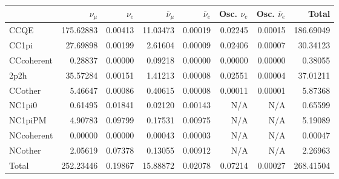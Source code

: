 \begin{tabular} { | l ||r | r | r | r | r | r | | r | }
\hline
              & $\nu_\mu$            & $\nu_e$              & $\bar{\nu}_{\mu}$    & $\bar{\nu}_{e}$      & Osc. $\nu_e$         & Osc. $\bar{\nu}_{e}$ & Total                \\ \hline\hline
 CCQE         & 175.62883            & 0.00413              & 11.03473             & 0.00019              & 0.02245              & 0.00015              & 186.69049            \\ \hline
 CC1pi        & 27.69898             & 0.00199              & 2.61604              & 0.00009              & 0.02406              & 0.00007              & 30.34123             \\ \hline
 CCcoherent   & 0.28837              & 0.00000              & 0.09218              & 0.00000              & 0.00000              & 0.00000              & 0.38055              \\ \hline
 2p2h         & 35.57284             & 0.00151              & 1.41213              & 0.00008              & 0.02551              & 0.00004              & 37.01211             \\ \hline
 CCother      & 5.46647              & 0.00086              & 0.40615              & 0.00008              & 0.00011              & 0.00001              & 5.87368              \\ \hline
 NC1pi0       & 0.61495              & 0.01841              & 0.02120              & 0.00143              & N/A                  & N/A                  & 0.65599              \\ \hline
 NC1piPM      & 4.90783              & 0.09799              & 0.17531              & 0.00975              & N/A                  & N/A                  & 5.19089              \\ \hline
 NCcoherent   & 0.00000              & 0.00000              & 0.00043              & 0.00003              & N/A                  & N/A                  & 0.00047              \\ \hline
 NCother      & 2.05619              & 0.07378              & 0.13055              & 0.00912              & N/A                  & N/A                  & 2.26963              \\ \hline
\hline
 Total        & 252.23446            & 0.19867              & 15.88872             & 0.02078              & 0.07214              & 0.00027              & 268.41504            \\ \hline

\end{tabular}
